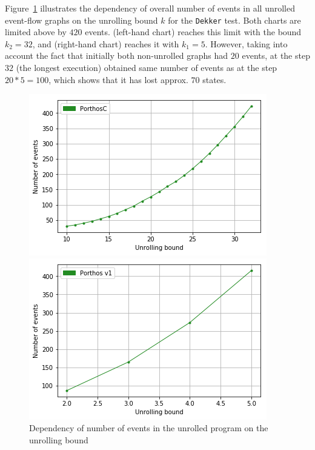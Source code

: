 Figure~\ref{dep:events} illustrates the dependency of overall number of events in all unrolled event-flow graphs on the unrolling bound $k$ for the \texttt{Dekker} test.
Both charts are limited above by $420$ events.
\porthos[2] (left-hand chart) reaches this limit with the bound $k_2=32$, and \porthos[1] (right-hand chart) reaches it with $k_1=5$.
However, taking into account the fact that initially both non-unrolled graphs had $20$ events, \porthos[2] at the step $32$ (the longest execution) obtained same number of events  as \porthos[1] at the step $20*5=100$, which shows that it has lost approx. $70$ states.

\begin{figure}[t]
\begin{minipage}{.45\textwidth}
\includegraphics[width=\textwidth,keepaspectratio]{img/my/performance/unr-events-new.png}
\end{minipage}
\hfill
%
\begin{minipage}{.45\textwidth}
\includegraphics[width=\textwidth,keepaspectratio]{img/my/performance/unr-events-old.png}
\end{minipage}
%
\caption{Dependency of number of events in the unrolled program on the unrolling bound}
\label{dep:events}
\end{figure}


